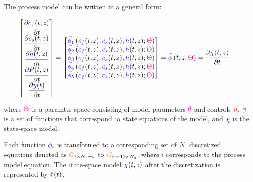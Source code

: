 \documentclass[../Article_Model_Parameters.tex]{subfiles}
\begin{document}
		The process model can be written in a general form:
			
		{\footnotesize
			\begin{align}
				\begin{bmatrix}
					\cfrac{\partial {\color{blue}c_f}(t,z)}{\partial t}\\
					\cfrac{\partial {\color{blue}c_s}(t,z)}{\partial t}\\
					\cfrac{\partial {\color{blue}h}(t,z)}{\partial t} \\
					\cfrac{\partial {\color{blue}P}(t,z)}{\partial t} \\
					\cfrac{\partial {\color{blue}y}(t)}{\partial t} 
				\end{bmatrix}
				& =
				\begin{bmatrix}
					{\color{blue}\bar{\phi_1}} \left( {\color{blue}c_f}(t,z),{\color{blue}c_s}(t,z),{\color{blue}h}(t,z); {\color{magenta}\Theta} \right)\\
					{\color{blue}\bar{\phi_2}} \left( {\color{blue}c_f}(t,z),{\color{blue}c_s}(t,z),{\color{blue}h}(t,z); {\color{magenta}\Theta} \right)\\
					{\color{blue}\bar{\phi_3}} \left( {\color{blue}c_f}(t,z),{\color{blue}c_s}(t,z),{\color{blue}h}(t,z); {\color{magenta}\Theta} \right) \\
					{\color{blue}\bar{\phi_4}} \left( {\color{blue}c_f}(t,z),{\color{blue}c_s}(t,z),{\color{blue}h}(t,z); {\color{magenta}\Theta} \right)\\
					{\color{blue}\bar{\phi_5}} \left( {\color{blue}c_f}(t,z),{\color{blue}c_s}(t,z),{\color{blue}h}(t,z); {\color{magenta}\Theta} \right)
				\end{bmatrix} = {\color{blue}\bar{\phi}} \left( t,z; {\color{magenta}\Theta} \right) = \cfrac{\partial {\color{blue}\chi}(t,z)}{\partial t}
		\end{align} }
			
		where ${\color{magenta}\Theta}$ is a paramter space consisting of model parameters ${\color{magenta}\theta}$ and controls ${\color{red}u}$, ${\color{blue}\bar{\phi}}$ is a set of functions that correspond to state equations of the model, and ${\color{blue}\chi}$ is the state-space model.
		
		Each function ${\color{blue}\bar{\phi_i}}$ is transformed to a corresponding set of $N_z$ discretized equations denoted as ${\color{orange}G}_{i\times N_z+1}$ to ${\color{orange}G}_{(i+1)\times N_z}$, where $i$ corresponds to the process model equation. The state-space model ${\color{blue}\chi}(t,z)$ after the discretization is represented by $\dot{{\color{blue}x}}(t)$.
			
\end{document}
